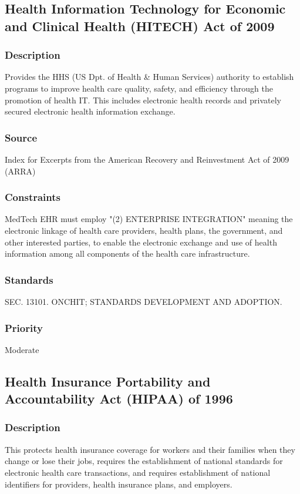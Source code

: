 \subsection{Health Information Technology for Economic and Clinical Health (HITECH) Act of 2009}
\subsubsection{Description}
Provides the HHS (US Dpt. of Health \& Human Services) authority to establish programs to improve health care quality, safety, and efficiency through the promotion of health IT. This includes electronic health records and privately secured electronic health information exchange.
\subsubsection{Source}
Index for Excerpts from the American Recovery and Reinvestment Act of 2009 (ARRA)
\subsubsection{Constraints}
MedTech EHR must employ "(2) ENTERPRISE INTEGRATION" meaning the electronic linkage of health care providers, health plans, the government, and other interested parties, to enable the electronic exchange and use of health information among all components of the health care infrastructure.
\subsubsection{Standards}
SEC. 13101. ONCHIT; STANDARDS DEVELOPMENT AND ADOPTION. \cite{UnitedStatesCongress2009}
\subsubsection{Priority}
Moderate

\subsection{Health Insurance Portability and Accountability Act (HIPAA) of 1996}
\subsubsection{Description}
This protects health insurance coverage for workers and their families when they change or lose their jobs, requires the establishment of national standards for electronic health care transactions, and requires establishment of national identifiers for providers, health insurance plans, and employers.
